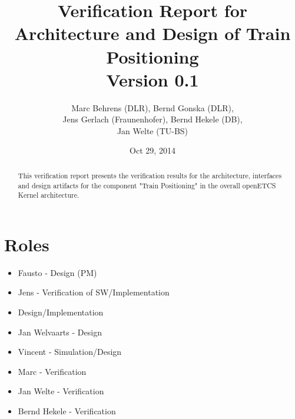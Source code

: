\documentclass{article}
\title{Verification Report for Architecture and Design of Train Positioning \\Version 0.1}
\author{Marc Behrens (DLR), Bernd Gonska (DLR),\\ Jens Gerlach (Fraunenhofer), Bernd Hekele (DB),\\ Jan Welte (TU-BS)}
\date{Oct 29, 2014}
\begin{document}
\maketitle

\begin{abstract}

This verification report presents the verification results for the architecture, interfaces and design artifacts for the component "Train Positioning" in the overall openETCS Kernel architecture.

\begin{comment}
This template provides the required content to complete the verification of architecture and design artifacts.
To close the development phase for this artifact all required information shall be given, even if it can only be stated that specific aspects are missing in the artifact due to open points in related artifacts. 

The template should be used as a guideline to check whether all
information is given appropriately. The wording used in this proposal
is by no means mandatory. And if you feel that more information is
useful to describe your activity within the context of openETCS, you
should of course do so. Feel free to add additional categories of
description as adequate. 

Also the \LaTeX{} macros may be changed, though the use of
\texttt{paragraph} and \texttt{subparagraph} enables easy integration
into higher-level documents (they are not numbered automatically,
which may be a drawback in other respects). 
\end{comment}
\end{abstract}

\section{Roles}

\begin{itemize}
\item Fausto - Design (PM)
\item Jens - Verification of SW/Implementation
\item Design/Implementation
\item Jan Welvaarts - Design
\item Vincent - Simulation/Design
\item Marc - Verification
\item Jan Welte - Verification
\item Bernd Hekele - Verification
\end{itemize}
\end{document}
